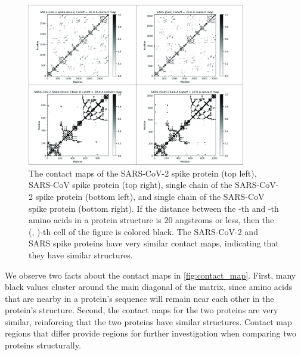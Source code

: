 \begin{figure}[h]
	\centering
	\mySfFamily
	\includegraphics[width = 0.85\textwidth]{../images_CMYK/Contact}
	\caption{The contact maps of the SARS-CoV-2 spike protein (top left), SARS-CoV spike protein (top right), single chain of the SARS-CoV-2 spike protein (bottom left), and single chain of the SARS-CoV spike protein (bottom right). If the distance between the -th and -th amino acids in a protein structure is 20 angstroms or less, then the (, )-th cell of the figure is colored black. The SARS-CoV-2 and SARS spike proteins have very similar contact maps, indicating that they have similar structures.}
	\label{fig:contact_map}
\end{figure}

\begin{note}\end{note}

We observe two facts about the contact maps in \autoref{fig:contact_map}. First, many black values cluster around the main diagonal of the matrix, since amino acids that are nearby in a protein's sequence will remain near each other in the protein's structure. Second, the contact maps for the two proteins are very similar, reinforcing that the two proteins have similar structures. Contact map regions that differ provide regions for further investigation when comparing two proteins structurally.\\



\begin{qbox}\end{qbox}

